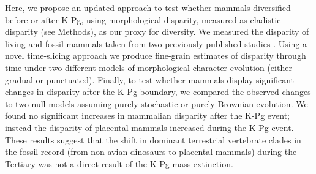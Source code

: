\documentclass[12pt,letterpaper]{article}
\begin{document}

Here, we propose an updated approach to test whether mammals diversified before or after K-Pg, using morphological disparity, measured as cladistic disparity (see Methods), as our proxy for diversity.
We measured the disparity of living and fossil mammals taken from two previously published studies \citep{Slater2012MEE,beckancient2014}. %
Using a novel time-slicing approach we produce fine-grain estimates of disparity through time under two different models of morphological character evolution (either gradual or punctuated). 
Finally, to test whether mammals display significant changes in disparity after the K-Pg boundary, we compared the observed changes to two null models assuming purely stochastic or purely Brownian evolution. 
We found no significant increases in mammalian disparity after the K-Pg event; instead the disparity of placental mammals increased during the K-Pg event. 
These results suggest that the shift in dominant terrestrial vertebrate clades in the fossil record (from non-avian dinosaurs to placental mammals) during the Tertiary was not a direct result of the K-Pg mass extinction.
\end{document}
